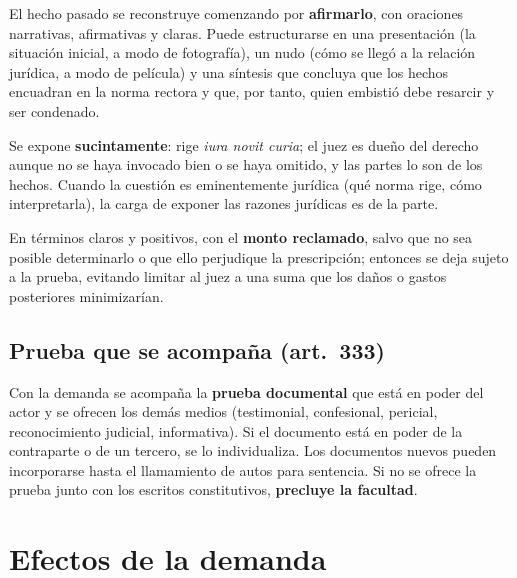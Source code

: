 \documentclass[12pt,oneside]{book}
\begin{document}
El hecho pasado se reconstruye comenzando por \textbf{afirmarlo}, con oraciones narrativas, afirmativas y claras. Puede estructurarse en una presentación (la situación inicial, a modo de fotografía), un nudo (cómo se llegó a la relación jurídica, a modo de película) y una síntesis que concluya que los hechos encuadran en la norma rectora y que, por tanto, quien embistió debe resarcir y ser condenado.

\begin{description}[leftmargin=0pt,style=nextline]
\item[Derecho (inc.~5).] Se expone \textbf{sucintamente}: rige \textit{iura novit curia}; el juez es dueño del derecho aunque no se haya invocado bien o se haya omitido, y las partes lo son de los hechos. Cuando la cuestión es eminentemente jurídica (qué norma rige, cómo interpretarla), la carga de exponer las razones jurídicas es de la parte.
\item[Petición (inc.~6).] En términos claros y positivos, con el \textbf{monto reclamado}, salvo que no sea posible determinarlo o que ello perjudique la prescripción; entonces se deja sujeto a la prueba, evitando limitar al juez a una suma que los daños o gastos posteriores minimizarían.
\end{description}

\subsection{Prueba que se acompaña (art.~333)}

Con la demanda se acompaña la \textbf{prueba documental} que está en poder del actor y se ofrecen los demás medios (testimonial, confesional, pericial, reconocimiento judicial, informativa). Si el documento está en poder de la contraparte o de un tercero, se lo individualiza. Los documentos nuevos pueden incorporarse hasta el llamamiento de autos para sentencia. Si no se ofrece la prueba junto con los escritos constitutivos, \textbf{precluye la facultad}.

\section{Efectos de la demanda}
\end{document}
